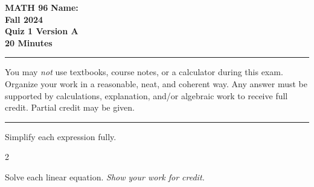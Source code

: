 \documentclass[11pt]{exam}
\begin{document}
\pagestyle{empty}
\textbf{MATH 96}  \textbf{Name:} \makebox[2.77in]{\hrulefill}\\
\textbf{Fall 2024} \\
\textbf{Quiz 1 Version A}\\
\textbf{20 Minutes}   

\rule[1ex]{\textwidth}{.1pt}
You may \emph{not} use textbooks, course notes, or a calculator during this exam. Organize your work in a reasonable, neat, and coherent way.  Any answer must be supported by calculations, explanation, and/or algebraic work to receive full credit. Partial credit may be given.
\vspace{5pt}\\
\rule[1ex]{\textwidth}{.1pt}
\noprintanswers
\begin{questions}
\vspace{-10pt}
\question[8] Simplify each expression fully.
\noaddpoints
\begin{multicols}{2}
\addpoints
\end{multicols}
\vspace{2.75in}
\question[22] Solve each linear equation. \emph{Show your work for credit.}
\noaddpoints
{}
\addpoints
\end{questions}
\end{document}
